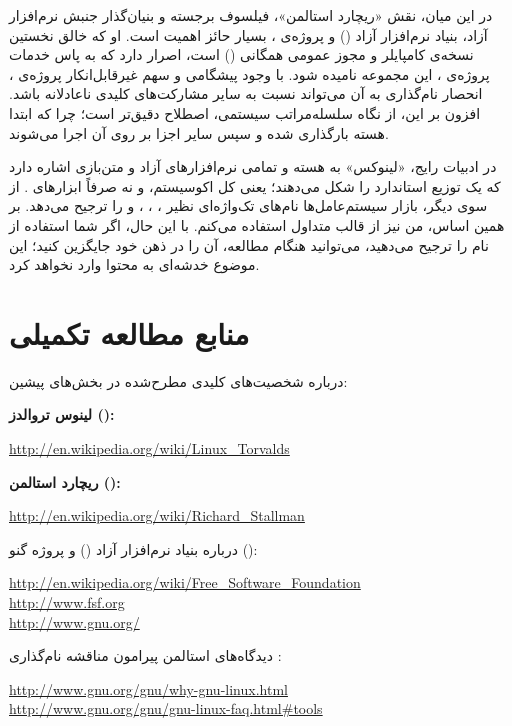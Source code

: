 در این میان، نقش «ریچارد استالمن»، فیلسوف برجسته و بنیان‌گذار جنبش نرم‌افزار آزاد، بنیاد نرم‌افزار آزاد () و پروژه‌ی ، بسیار حائز اهمیت است. او که خالق نخستین نسخه‌ی کامپایلر  و مجوز عمومی همگانی () است، اصرار دارد که به پاس خدمات پروژه‌ی ، این مجموعه  نامیده شود. با وجود پیشگامی و سهم غیرقابل‌انکار پروژه‌ی ، انحصار نام‌گذاری به آن می‌تواند نسبت به سایر مشارکت‌های کلیدی ناعادلانه باشد. افزون بر این، از نگاه سلسله‌مراتب سیستمی، اصطلاح  دقیق‌تر است؛ چرا که ابتدا هسته بارگذاری شده و سپس سایر اجزا بر روی آن اجرا می‌شوند.

در ادبیات رایج، «لینوکس» به هسته و تمامی نرم‌افزارهای آزاد و متن‌بازی اشاره دارد که یک توزیع استاندارد را شکل می‌دهند؛ یعنی کل اکوسیستم، و نه صرفاً ابزارهای . از سوی دیگر، بازار سیستم‌عامل‌ها نام‌های تک‌واژه‌ای نظیر ، ، ،  و  را ترجیح می‌دهد. بر همین اساس، من نیز از قالب متداول استفاده می‌کنم. با این حال، اگر شما استفاده از نام  را ترجیح می‌دهید، می‌توانید هنگام مطالعه، آن را در ذهن خود جایگزین کنید؛ این موضوع خدشه‌ای به محتوا وارد نخواهد کرد.

\section*{منابع مطالعه تکمیلی}

درباره شخصیت‌های کلیدی مطرح‌شده در بخش‌های پیشین:

\textbf{لینوس تروالدز ():}
\begin{latin}
\url{http://en.wikipedia.org/wiki/Linux_Torvalds}
\end{latin}

\textbf{ریچارد استالمن ():}
\begin{latin}
\url{http://en.wikipedia.org/wiki/Richard_Stallman}
\end{latin}

درباره بنیاد نرم‌افزار آزاد () و پروژه گنو ():
\begin{latin}
\url{http://en.wikipedia.org/wiki/Free_Software_Foundation}\\
\url{http://www.fsf.org}\\
\url{http://www.gnu.org/}
\end{latin}

دیدگاه‌های استالمن پیرامون مناقشه نام‌گذاری :
\begin{latin}
\url{http://www.gnu.org/gnu/why-gnu-linux.html}\\
\url{http://www.gnu.org/gnu/gnu-linux-faq.html#tools}
\end{latin}